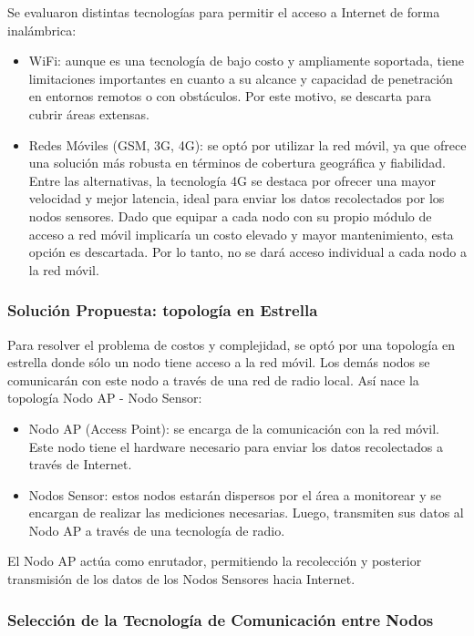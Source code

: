 Se evaluaron distintas tecnologías para permitir el acceso a Internet de forma inalámbrica:

\begin{itemize}
    \item WiFi: aunque es una tecnología de bajo costo y ampliamente soportada, tiene limitaciones importantes en cuanto a su alcance y capacidad de penetración en entornos remotos o con obstáculos. Por este motivo, se descarta para cubrir áreas extensas.
    \item Redes Móviles (GSM, 3G, 4G): se optó por utilizar la red móvil, ya que ofrece una solución más robusta en términos de cobertura geográfica y fiabilidad. Entre las alternativas, la tecnología 4G se destaca por ofrecer una mayor velocidad y mejor latencia, ideal para enviar los datos recolectados por los nodos sensores. 
    Dado que equipar a cada nodo con su propio módulo de acceso a red móvil implicaría un costo elevado y mayor mantenimiento, esta opción es descartada. Por lo tanto, no se dará acceso individual a cada nodo a la red móvil.
\end{itemize}



\subsubsection{Solución Propuesta: topología en Estrella}

Para resolver el problema de costos y complejidad, se optó por una topología en estrella donde sólo un nodo tiene acceso a la red móvil. Los demás nodos se comunicarán con este nodo a través de una red de radio local. Así nace la topología Nodo AP - Nodo Sensor:

\begin{itemize}
    \item Nodo AP (Access Point): se encarga de la comunicación con la red móvil. Este nodo tiene el hardware necesario para enviar los datos recolectados a través de Internet.
    \item Nodos Sensor: estos nodos estarán dispersos por el área a monitorear y se encargan de realizar las mediciones necesarias. Luego, transmiten sus datos al Nodo AP a través de una tecnología de radio.
\end{itemize}

El Nodo AP actúa como enrutador, permitiendo la recolección y posterior transmisión de los datos de los Nodos Sensores hacia Internet.

\subsubsection{Selección de la Tecnología de Comunicación entre Nodos}

